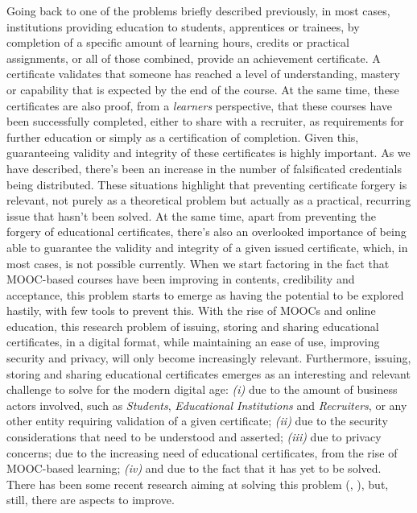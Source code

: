 Going back to one of the problems briefly described previously, in most cases, institutions providing education to students, apprentices or trainees, by completion of a specific amount of learning hours, credits or practical assignments, or all of those combined, provide an achievement certificate. A certificate validates that someone has reached a level of understanding, mastery or capability that is expected by the end of the course. At the same time, these certificates are also proof, from a \textit{learners} perspective, that these courses have been successfully completed, either to share with a recruiter, as requirements for further education or simply as a certification of completion. Given this, guaranteeing validity and integrity of these certificates is highly important. As we have described, there's been an increase in the number of falsificated credentials being distributed. These situations highlight that preventing certificate forgery is relevant, not purely as a theoretical problem but actually as a practical, recurring issue that hasn't been solved. At the same time, apart from preventing the forgery of educational certificates, there's also an overlooked importance of being able to guarantee the validity and integrity of a given issued certificate, which, in most cases, is not possible currently. When we start factoring in the fact that MOOC-based courses have been improving in contents, credibility and acceptance, this problem starts to emerge as having the potential to be explored hastily, with few tools to prevent this. With the rise of MOOCs and online education, this research problem of issuing, storing and sharing educational certificates, in a digital format, while maintaining an ease of use, improving security and privacy, will only become increasingly relevant. Furthermore, issuing, storing and sharing educational certificates emerges as an interesting and relevant challenge to solve for the modern digital age: \emph{(i)} due to the amount of business actors involved, such as \textit{Students}, \textit{Educational Institutions} and \textit{Recruiters}, or any other entity requiring validation of a given certificate; \emph{(ii)} due to the security considerations that need to be understood and asserted; \emph{(iii)} due to privacy concerns; due to the increasing need of educational certificates, from the rise of MOOC-based learning; \emph{(iv)} and due to the fact that it has yet to be solved. There has been some recent research aiming at solving this problem (\cite{MITCertificates}, \cite{Blockcerts}), but, still, there are aspects to improve.

